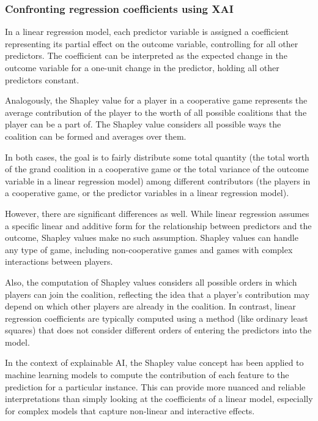 \documentclass[
  letterpaper,
  DIV=11,
  numbers=noendperiod]{scrartcl}
\begin{document}
\hypertarget{confronting-regression-coefficients-using-xai}{%
\subsubsection{Confronting regression coefficients using
XAI}\label{confronting-regression-coefficients-using-xai}}

In a linear regression model, each predictor variable is assigned a
coefficient representing its partial effect on the outcome variable,
controlling for all other predictors. The coefficient can be interpreted
as the expected change in the outcome variable for a one-unit change in
the predictor, holding all other predictors constant.

Analogously, the Shapley value for a player in a cooperative game
represents the average contribution of the player to the worth of all
possible coalitions that the player can be a part of. The Shapley value
considers all possible ways the coalition can be formed and averages
over them.

In both cases, the goal is to fairly distribute some total quantity (the
total worth of the grand coalition in a cooperative game or the total
variance of the outcome variable in a linear regression model) among
different contributors (the players in a cooperative game, or the
predictor variables in a linear regression model).

However, there are significant differences as well. While linear
regression assumes a specific linear and additive form for the
relationship between predictors and the outcome, Shapley values make no
such assumption. Shapley values can handle any type of game, including
non-cooperative games and games with complex interactions between
players.

Also, the computation of Shapley values considers all possible orders in
which players can join the coalition, reflecting the idea that a
player's contribution may depend on which other players are already in
the coalition. In contrast, linear regression coefficients are typically
computed using a method (like ordinary least squares) that does not
consider different orders of entering the predictors into the model.

In the context of explainable AI, the Shapley value concept has been
applied to machine learning models to compute the contribution of each
feature to the prediction for a particular instance. This can provide
more nuanced and reliable interpretations than simply looking at the
coefficients of a linear model, especially for complex models that
capture non-linear and interactive effects.
\end{document}
